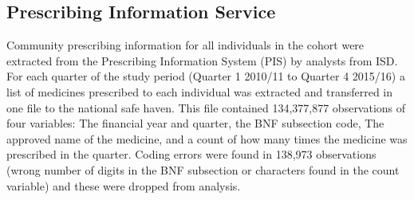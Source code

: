 \documentclass[]{article}
\begin{document}
\begin{table}[]
\caption{Social Care Survey file data}
\label{tab:scs-vars}
\end{table}

\FloatBarrier

\subsection{Prescribing Information Service}\label{subsec:pis-summs}

Community prescribing information for all individuals in the cohort were
extracted from the Prescribing Information System (PIS) by analysts from
ISD. For each quarter of the study period (Quarter 1 2010/11 to Quarter
4 2015/16) a list of medicines prescribed to each individual was
extracted and transferred in one file to the national safe haven. This
file contained 134,377,877 observations of four variables: The financial
year and quarter, the BNF subsection code, The approved name of the
medicine, and a count of how many times the medicine was prescribed in
the quarter. Coding errors were found in 138,973 observations (wrong
number of digits in the BNF subsection or characters found in the count
variable) and these were dropped from analysis.
\end{document}
